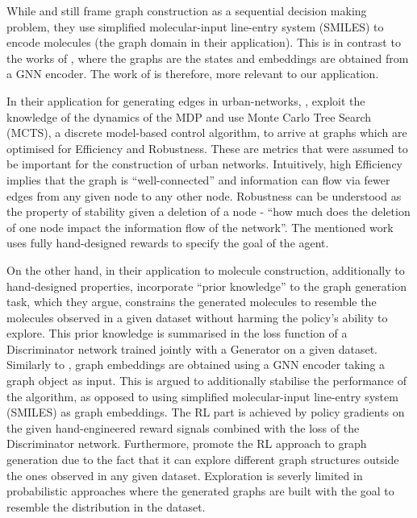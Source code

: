 \documentclass{report}
\numberwithin{equation}{section}
\numberwithin{figure}{section}
\numberwithin{table}{section}
\numberwithin{algorithm}{section}
\begin{document}
While \cite{Yang2017} and \cite{olivecrona2017molecular} 
still frame graph construction as a 
sequential decision making problem, 
they use simplified molecular-input line-entry system (SMILES) to 
encode molecules (the graph domain in their application). 
This is in contrast to the works of \citet{Darvariu,GCNPolicyGraphGen,GraphOpt},
where the graphs are the states and embeddings are obtained 
from a GNN 
encoder. The work of \citet{Darvariu,GCNPolicyGraphGen,GraphOpt} 
is therefore, more relevant to our application. 

In their application for generating edges in urban-networks, 
\cite{Darvariu}, exploit the knowledge of the dynamics of 
the MDP and use Monte Carlo Tree Search (MCTS), a discrete 
model-based control algorithm, to arrive at 
graphs which are optimised for 
Efficiency and Robustness. These are metrics that were assumed 
to be important for the construction of urban networks. Intuitively, 
high Efficiency implies that the graph is ``well-connected'' and 
information can flow via fewer edges from any given node to any 
other node. Robustness can be understood as the property of 
stability given a deletion of a node - ``how 
much does the deletion of one node impact the information flow 
of the network''. The mentioned work uses fully hand-designed 
rewards to specify the goal of the agent.

On the other hand, in their application to 
molecule construction, 
additionally to hand-designed properties, \cite{GCNPolicyGraphGen}
incorporate ``prior knowledge'' to the graph generation task, which 
they argue, constrains the generated molecules to resemble the 
molecules observed in a given dataset without harming the 
policy's ability to explore. This prior knowledge is 
summarised in the loss function of a Discriminator network trained 
jointly with a Generator on a given dataset. Similarly to \cite{Darvariu}, 
graph embeddings are obtained using a GNN encoder taking a graph 
object as input. This is argued to additionally stabilise the 
performance of the algorithm, as opposed to using 
simplified molecular-input line-entry system (SMILES) as 
graph embeddings.
 The RL part is achieved by policy gradients 
on the given hand-engineered 
reward signals combined with the loss of the Discriminator 
network. Furthermore, \cite{GCNPolicyGraphGen} promote the RL 
approach to graph generation due to the fact that it can explore 
different graph structures outside the ones observed in any 
given dataset. Exploration is severly limited in probabilistic 
approaches where the generated graphs are built with the goal 
to resemble the distribution in the dataset.
\end{document}
